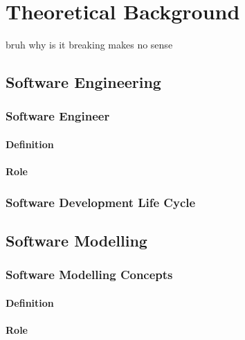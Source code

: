
%

\chapter{Theoretical Background}
\label{cha:theoretical_background}

bruh why is it breaking makes no sense

\section{Software Engineering}

\subsection{Software Engineer}

\subsubsection{Definition}

\subsubsection{Role}

\subsection{Software Development Life Cycle}

\section{Software Modelling}

\subsection{Software Modelling Concepts}
      
\subsubsection{Definition}

\subsubsection{Role}

